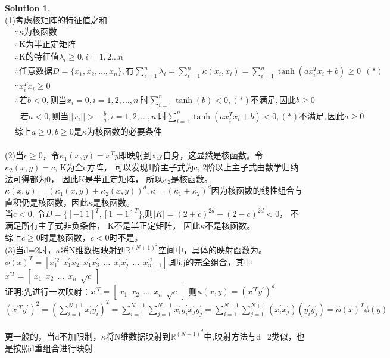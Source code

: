\documentclass[a4paper,UTF8]{article}
\theoremstyle{definition}
\newtheorem*{solution}{Solution}
\begin{document}
\begin{solution}\ \\
	(1)考虑核矩阵的特征值之和
	\begin{equation*}
		\begin{split}
			&\because \kappa \text{为核函数}\\
			&\therefore \text{K为半正定矩阵}\\
			&\therefore \text{K的特征值}\lambda_i \ge 0,i=1,2 \dots n\\
			&\therefore \text{任意数据}D=\{x_1,x_2,\dots,x_n\} ,\text{有}\sum_{i=1}^n \lambda_i=\sum_{i=1}^n \kappa(x_i,x_i) =\sum_{i=1}^n \tanh(a x_i^Tx_i+b) \ge 0\ \ (*)\\
			&\because x_i^Tx_i \ge 0\\
			&\therefore \text{若} b < 0, \text{则当} x_i = 0,i=1,2,\dots,n\ \text{时} \sum_{i=1}^n \tanh(b)<0,(*)\text{不满足},\text{因此} b \ge 0\\
			&\ \ \ \text{若} a<0, \text{则当} ||x_i|| > -\frac{b}{a},i=1,2,\dots,n\ \text{时} \sum_{i=1}^n \tanh(ax_i^Tx_i+b)<0,(*)\text{不满足},\text{因此}a\ge 0\\
			&\text{综上}a\ge 0,b\ge 0\text{是}\kappa\text{为核函数的必要条件}
		\end{split}
	\end{equation*}
	\\(2)当$c\ge 0$，令$\kappa_1(x,y) = x^Ty$即映射到x,y自身，这显然是核函数。令$\kappa_2(x,y)=c$, K为全c方阵， 可以发现1阶主子式为c, 2阶以上主子式由数学归纳法可得都为0， 因此K是半正定矩阵， 所以$\kappa_2$是核函数。$\kappa(x,y)=(\kappa_1(x,y)+\kappa_2(x,y))^d, \kappa=(\kappa_1+\kappa_2)^d$因为核函数的线性组合与直积仍是核函数，因此$\kappa$是核函数。\\
	当$c<0$, 令$D=\{[-1\ 1]^T,[1\ -1]^T\}$,则$|K|=(2+c)^{2d}-(2-c)^{2d} < 0$， 不满足所有主子式非负条件， K不是半正定矩阵， 因此$\kappa$不是核函数。\\
	综上$c\ge 0$时是核函数，$c<0$时不是。
	\\(3)当d=2时，$\kappa$将N维数据映射到$\mathbb{R}^{(N+1)^2}$空间中，具体的映射函数为。\\
	$\phi(x)^T=[x_1^{\prime 2}\ \ x_1^\prime x_2^\prime\ \ x_1^\prime x_3^\prime\ \ \dots \ \ x_i^\prime x_j^\prime\ \ \dots\ \ x_{n+1}^{\prime 2}]$,即i,j的完全组合，其中 $x^{\prime T}=[\ x_1\ \ x_2\ \ \dots\ \ x_n\ \ \sqrt{c}\ ]$\\
	证明:先进行一次映射：$x^{\prime T}=[\ x_1\ \ x_2\ \ \dots\ \ x_n\ \ \sqrt{c}\ ]$ 则$\kappa(x,y)=(x^{\prime T}y^\prime)^d$\\
	$(x^{\prime T}y^\prime)^2 = (\sum_{i=1}^{N+1}x^\prime_iy^\prime_i)^2=\sum_{i=1}^{N+1}\sum_{j=1}^{N+1}x^\prime_iy^\prime_ix^\prime_jy^\prime_j=\sum_{i=1}^{N+1}\sum_{j=1}^{N+1}(x^\prime_ix^\prime_j)(y^\prime_iy^\prime_j)=\phi(x)^T\phi(y)$\\
	\\更一般的，当d不加限制，$\kappa$将N维数据映射到$\mathbb{R}^{(N+1)^d}$中,映射方法与d=2类似，也是按照d重组合进行映射
\end{solution}
\end{document}
